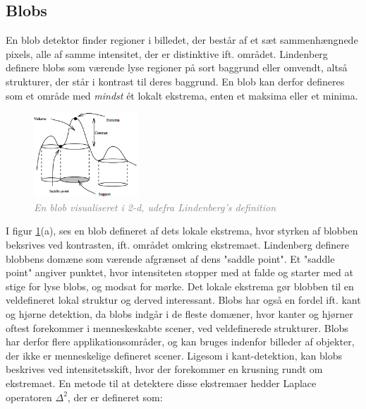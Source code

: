 \subsection{Blobs}
En blob detektor finder regioner i billedet, der består af et sæt sammenhængnede pixels, alle af samme intensitet, der er distinktive ift. området. Lindenberg \cite{blob} definere blobs som værende lyse regioner på sort baggrund eller omvendt, altså strukturer, der står i kontrast til deres baggrund. En blob kan derfor defineres som et område med \emph{mindst} ét lokalt ekstrema, enten et maksima eller et minima.
\begin{figure}[H]
    \centering
    \includegraphics[width=0.35\textwidth]{fig/11.png}
    \vspace{-0.5em}   
    \begin{center}
    \caption{\textcolor{gray}{\footnotesize \textit{
    En blob visualiseret i 2-d, udefra Lindenberg's definition \cite{blob}}}}
    \label{fig:lindblob}
     \end{center}
  \end{figure}
       \vspace{-2.7em}
\noindent
I figur \ref{fig:lindblob}(a), ses en blob defineret af dets lokale ekstrema, hvor styrken af blobben beksrives ved kontrasten, ift. området omkring ekstremaet. Lindenberg definere blobbens domæne som værende afgrænset af dens "saddle point". Et "saddle point" angiver punktet, hvor intensiteten stopper med at falde og starter med at stige for lyse blobs, og modsat for mørke. Det lokale ekstrema gør blobben til en veldefineret lokal struktur og derved interessant. Blobs har også en fordel ift. kant og hjørne detektion, da blobs indgår i de fleste domæner, hvor kanter og hjørner oftest forekommer i menneskeskabte scener, ved veldefinerede strukturer. Blobs har derfor flere applikationsområder, og kan bruges indenfor billeder af objekter, der ikke er menneskelige defineret scener.  Ligesom i kant-detektion, kan blobs beskrives ved intensitetsskift, hvor der forekommer en krusning rundt om ekstremaet. En metode til at detektere disse ekstremaer hedder Laplace operatoren $\Delta^2$, der er defineret som:
